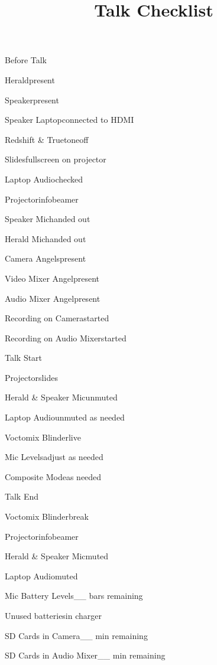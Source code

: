 \def\papersize{5}




\title{Talk Checklist}

\begin{checklist}{Before Talk}
  \item{Herald}{present}
  \item{Speaker}{present}
  \item{Speaker Laptop}{connected to HDMI}
  \item{Redshift \& Truetone}{off}
  \item{Slides}{fullscreen on projector}
  \item{Laptop Audio}{checked}
  \item{Projector}{infobeamer}
  \item{Speaker Mic}{handed out}
  \item{Herald Mic}{handed out}
  \item{Camera Angels}{present}
  \item{Video Mixer Angel}{present}
  \item{Audio Mixer Angel}{present}
  \item{Recording on Camera}{started}
  \item{Recording on Audio Mixer}{started}
\end{checklist}

\begin{checklist}{Talk Start}
  \item{Projector}{slides}
  \item{Herald \& Speaker Mic}{unmuted}
  \item{Laptop Audio}{unmuted as needed}
  \item{Voctomix Blinder}{live}
  \item{Mic Levels}{adjust as needed}

  \item{Composite Mode}{as needed}
\end{checklist}

\begin{checklist}{Talk End}
  \item{Voctomix Blinder}{break}
  \item{Projector}{infobeamer}
  \item{Herald \& Speaker Mic}{muted}
  \item{Laptop Audio}{muted}
  \item{Mic Battery Levels}{\_\_ bars remaining}
  \item{Unused batteries}{in charger}
  \item{SD Cards in Camera}{\_\_ min remaining}
  \item{SD Cards in Audio Mixer}{\_\_ min remaining}
\end{checklist}


